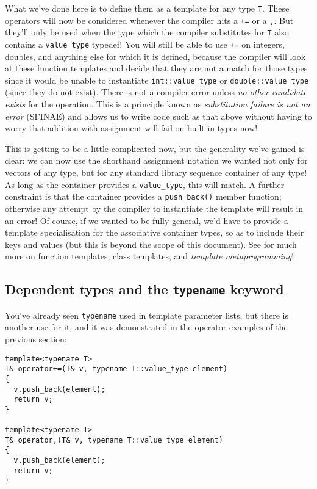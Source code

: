 \documentclass[a4paper]{scrartcl}
\begin{document}
What we've done here is to define them as a template for any type \verb|T|. These operators will now be considered whenever the compiler hits a \verb|+=| or a \verb|,|. But they'll only be used when the type which the compiler substitutes for \verb|T| also contains a \verb|value_type| typedef! You will still be able to use \verb|+=| on integers, doubles, and anything else for which it is defined, because the compiler will look at these function templates and decide that they are not a match for those types since it would be unable to instantiate \verb|int::value_type| or \verb|double::value_type| (since they do not exist). There is not a compiler error unless \emph{no other candidate exists} for the operation. This is a principle known as \emph{substitution failure is not an error} (SFINAE) and allows us to write code such as that above without having to worry that addition-with-assignment will fail on built-in types now!

This is getting to be a little complicated now, but the generality we've gained is clear: we can now use the shorthand assignment notation we wanted not only for vectors of any type, but for any standard library sequence container of any type! As long as the container provides a \verb|value_type|, this will match. A further constraint is that the container provides a \verb|push_back()| member function; otherwise any attempt by the compiler to instantiate the template will result in an error! Of course, if we wanted to be fully general, we'd have to provide a template specialisation for the associative container types, so as to include their keys and values (but this is beyond the scope of this document). See\cite{Templates} for much more on function templates, class templates, and \emph{template metaprogramming}!

\subsection{Dependent types and the \texttt{typename} keyword}
You've already seen \verb|typename| used in template parameter lists, but there is another use for it, and it was demonstrated in the operator examples of the previous section:
\begin{verbatim}
template<typename T>
T& operator+=(T& v, typename T::value_type element)
{
  v.push_back(element);
  return v;
}

template<typename T>
T& operator,(T& v, typename T::value_type element)
{
  v.push_back(element);
  return v;
}
\end{verbatim}
\end{document}
